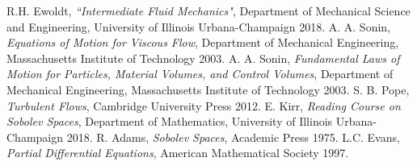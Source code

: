 {} 
\begin{thebibliography}{9}
R.H. Ewoldt,
\textit{``Intermediate Fluid Mechanics"},
Department of Mechanical Science and Engineering, University of Illinois Urbana-Champaign
2018.
A. A. Sonin,
\textit{Equations of Motion for Viscous Flow},
Department of Mechanical Engineering, Massachusetts Institute of Technology
2003.
A. A. Sonin,
\textit{Fundamental Laws of Motion for Particles, Material Volumes, and Control Volumes},
Department of Mechanical Engineering, Massachusetts Institute of Technology
2003.
 S. B. Pope,
\textit{Turbulent Flows},
Cambridge University Press 2012.
 E. Kirr,
\textit{Reading Course on Sobolev Spaces},
Department of Mathematics, University of Illinois Urbana-Champaign 2018.
 R. Adams,
\textit{Sobolev Spaces},
Academic Press 1975.
 L.C. Evans,
\textit{Partial Differential Equations},
American Mathematical Society 1997.
\end{thebibliography}
